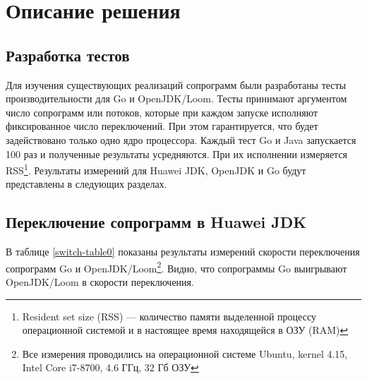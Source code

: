 \section{Описание решения}
	
	\subsection{Разработка тестов}
	Для изучения существующих реализаций сопрограмм были разработаны тесты
	производительности для Go и OpenJDK/Loom. 
	Тесты принимают аргументом число сопрограмм или потоков, которые при каждом запуске
	исполняют фиксированное число переключений. При этом гарантируется, что будет задействовано  
	только одно ядро процессора. Каждый тест Go и Java запускается 100 раз и полученные результаты усредняются.
	При их исполнении измеряется RSS\footnote{Resident set size (RSS) — количество памяти
	выделенной процессу операционной системой и в настоящее время находящейся в ОЗУ (RAM)}.
	Результаты измерений для Huawei JDK, OpenJDK и Go будут представлены в следующих разделах.
	\clearpage
	
	\subsection{Переключение сопрограмм в Huawei JDK}
	В таблице \ref{switch-table0} показаны результаты измерений скорости переключения сопрограмм Go и 
	OpenJDK/Loom\footnote{Все измерения проводились на операционной системе Ubuntu, kernel 4.15, Intel Core i7-8700,
	4.6 ГГц, 32 Гб ОЗУ}. Видно, что сопрограммы Go выигрывают OpenJDK/Loom в скорости переключения.
	

